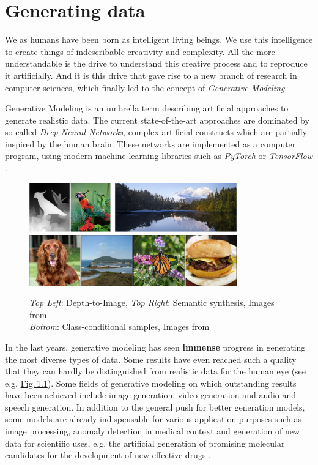 
\section{Generating data} \label{sec:1.1}
\thispagestyle{plain}
We as humans have been born as intelligent living beings. We use this intelligence to create things of indescribable creativity and complexity. All the more understandable is the drive to understand this creative process and to reproduce it artificially. And it is this drive that gave rise to a new branch of research in computer sciences, which finally led to the concept of \textit{Generative Modeling}.

\thispagestyle{plain}
Generative Modeling is an umbrella term describing artificial approaches to generate realistic data. The current state-of-the-art approaches are dominated by so called \textit{Deep Neural Networks}, complex artificial constructs which are partially inspired by the human brain. These networks are implemented as a computer program, using modern machine learning libraries such as \textit{PyTorch} \cite{pytorch} or \textit{TensorFlow} \cite{tensorflow}.

%
\begin{figure}[] \label{fig:1.1}
    \centering
    \includegraphics[width=0.8\textwidth]{Chapters/figures/transformer.PNG}
    \includegraphics[width=0.8\textwidth]{Chapters/figures/biggan.PNG}
    \caption[Examples for state-of-the-art samples]{\textit{Top Left}: Depth-to-Image, \textit{Top Right}: Semantic synthesis, Images from \cite{taming}\\\textit{Bottom}: Class-conditional samples, Images from \cite{biggan}} 
\end{figure}
%
\thispagestyle{plain}
In the last years, generative modeling has seen \textbf{immense} progress in generating the most diverse types of data. Some results have even reached such a quality that they can hardly be distinguished from realistic data for the human eye (see e.g. \hyperref[fig:1.1]{Fig.\,1.1}). Some fields of generative modeling on which outstanding results have been achieved include image generation, video generation and audio and speech generation. In addition to the general push for better generation models, some models are already indispensable for various application purposes such as image processing, anomaly detection in medical context and generation of new data for scientific uses, e.g. the artificial generation of promising molecular candidates for the development of new effective drugs \cite{molgrad}.
\thispagestyle{plain}
